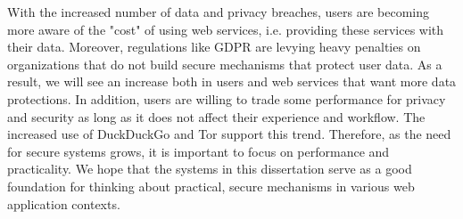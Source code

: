 With the increased number of data and privacy breaches, users are becoming
more aware of the "cost" of using web services, i.e. providing these services
with their data. Moreover, regulations like
GDPR are levying heavy penalties on organizations that do not build
secure mechanisms that protect user data. As a result, we will see
an increase both in users and web services that want more data protections.
In addition, users are willing to trade some performance for privacy and security
as long as it does not affect their experience and workflow. The increased
use of DuckDuckGo and Tor support this trend. Therefore,
as the need for secure systems grows, it is important to focus on performance
and practicality. We hope that the systems in this dissertation serve
as a good foundation for thinking about practical, secure mechanisms
in various web application contexts.
